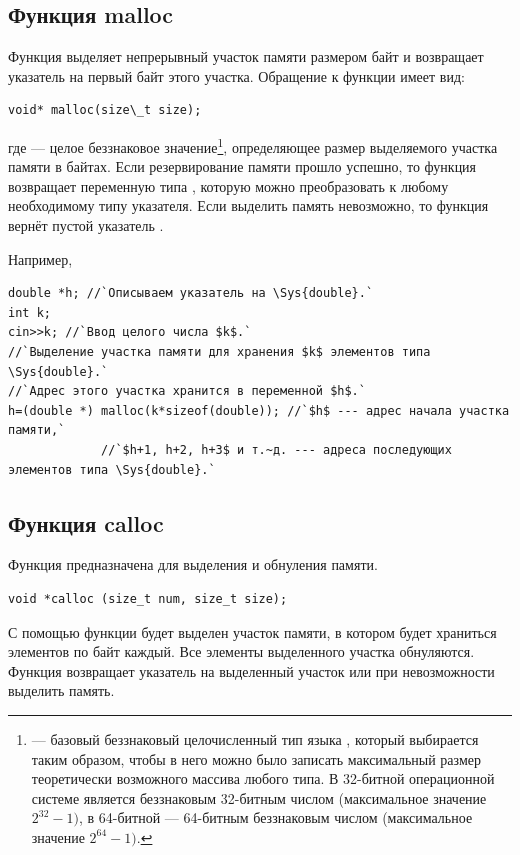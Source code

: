 \subsection[Функция malloc]{Функция malloc}
Функция  выделяет непрерывный участок памяти размером
 байт и возвращает указатель на первый байт этого участка. Обращение к функции имеет вид:

\begin{lstlisting}
void* malloc(size\_t size);
\end{lstlisting}
где  --- целое беззнаковое значение\footnote{ --- базовый беззнаковый целочисленный тип языка
, который выбирается таким образом, чтобы в него можно было записать максимальный размер теоретически возможного
массива любого типа. В 32-битной операционной системе  является беззнаковым 32-битным числом (максимальное
значение  $2^{32}-1)$, в 64-битной --- 64-битным беззнаковым числом (максимальное значение  $2^{64}-1)$.}, определяющее
размер выделяемого участка памяти в байтах. Если резервирование памяти прошло успешно, то функция возвращает переменную
типа , которую можно преобразовать к любому необходимому типу указателя. Если выделить память
невозможно, то функция вернёт пустой указатель .

Например,
\begin{lstlisting}
double *h; //`Описываем указатель на \Sys{double}.`
int k;
cin>>k; //`Ввод целого числа $k$.`
//`Выделение участка памяти для хранения $k$ элементов типа \Sys{double}.` 
//`Адрес этого участка хранится в переменной $h$.`
h=(double *) malloc(k*sizeof(double)); //`$h$ --- адрес начала участка памяти,`
             //`$h+1, h+2, h+3$ и т.~д. --- адреса последующих элементов типа \Sys{double}.`
\end{lstlisting}

\subsection[Функция calloc]{Функция calloc}
Функция  предназначена для выделения и обнуления памяти. 
\begin{lstlisting}
void *calloc (size_t num, size_t size);
\end{lstlisting}

С помощью функции будет выделен участок памяти, в котором будет храниться  элементов по
 байт каждый. Все элементы выделенного участка обнуляются. Функция возвращает указатель
на выделенный участок или  при невозможности выделить память.

